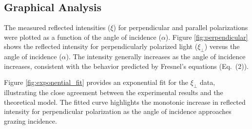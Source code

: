 \documentclass[journal]{IEEEtran}
\begin{document}
\subsection{Graphical Analysis}
The measured reflected intensities ($\xi$) for perpendicular and parallel polarizations were plotted as a function of the angle of incidence ($\alpha$).
Figure \ref{fig:perpendicular} shows the reflected intensity for perpendicularly polarized light ($\xi_{\perp}$) versus the angle of incidence ($\alpha$). The intensity generally increases as the angle of incidence increases, consistent with the behavior predicted by Fresnel's equations (Eq.~(2)).

Figure \ref{fig:exponential_fit} provides an exponential fit for the $\xi_{\perp}$ data, illustrating the close agreement between the experimental results and the theoretical model. The fitted curve highlights the monotonic increase in reflected intensity for perpendicular polarization as the angle of incidence approaches grazing incidence.
\end{document}

